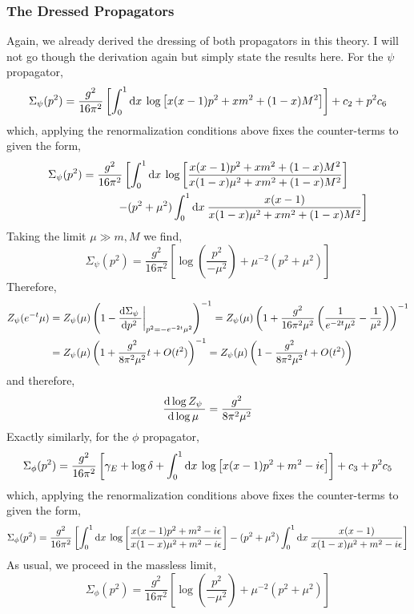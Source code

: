 \documentclass[12pt]{article}
\begin{document}
\subsubsection{The Dressed Propagators}

Again, we already derived the dressing of both propagators in this theory. I will not go though the derivation again but simply state the results here. 
For the $\psi$ propagator,
\[ \Sigma_\psi(p^2) = \frac{g^2}{16 \pi^2} \left[ \int_{0}^{1} \mathrm{d}x \: \log{\left[ x(x - 1) p^2 + x m^2 + (1 - x) M^2 \right]} \right] + c_2 + p^2 c_6 \]
which, applying the renormalization conditions above fixes the counter-terms to given the form,
\begin{align*}
\Sigma_\psi(p^2) & = \frac{g^2}{16 \pi^2} \left[ \int_{0}^{1} \mathrm{d}x \: \log{\left[ \frac{x(x - 1) p^2 + x m^2 + (1 - x) M^2}{x(1 - x)\mu^2 + x m^2 + (1 - x) M^2} \right]}  \right.
\\
& \left. \quad \quad \quad - (p^2 + \mu^2) \int_{0}^{1} \mathrm{d}x \: \frac{x(x - 1)}{x(1 - x)\mu^2 + x m^2 + (1 - x) M^2} \right]
\end{align*}
Taking the limit $\mu \gg m, M$ we find,
\[ \Sigma_\psi(p^2) = \frac{g^2}{16 \pi^2} \left[ \log{\left( \frac{p^2}{-\mu^2} \right)} + \mu^{-2} (p^2 + \mu^2) \right] \]
Therefore, 
\begin{align*}
Z_\psi(e^{-t} \mu) & = Z_{\psi}(\mu) \left(1 - \frac{\mathrm{d}\Sigma_\psi \:}{\mathrm{d}p^2 \:} \bigg|_{p^2 = - e^{-2t}\mu^2} \right)^{-1} = Z_\psi(\mu) \left( 1 + \frac{g^2}{16 \pi^2 \mu^2} \left( \frac{1}{e^{-2t} \mu^2} - \frac{1}{\mu^2} \right) \right)^{-1} 
\\
& = Z_\psi(\mu) \left( 1 + \frac{g^2}{8 \pi^2 \mu^2} t  + O(t^2) \right)^{-1} = Z_\psi(\mu) \left( 1 - \frac{g^2}{8 \pi^2 \mu^2} t  + O(t^2) \right)
\end{align*}
and therefore,
\[ \frac{\mathrm{d}\log{Z_{\psi}} \:}{\mathrm{d}\log{\mu} \:} = \frac{g^2}{8 \pi^2 \mu^2} \]
Exactly similarly, for the $\phi$ propagator, 
\[ \Sigma_\phi(p^2) = \frac{g^2}{16 \pi^2} \left[ \gamma_E + \log{\delta} + \int_{0}^{1} \mathrm{d}x \: \log{\left[ x(x-1)p^2 + m^2 - i \epsilon \right]} \right] + c_3 + p^2 c_5  \]
which, applying the renormalization conditions above fixes the counter-terms to given the form,
\[ \Sigma_\phi(p^2) = \frac{g^2}{16 \pi^2} \left[ \int_{0}^{1} \mathrm{d}x \: \log{\left[\frac{x(x-1)p^2 + m^2 - i \epsilon}{x(1-x)\mu^2 + m^2 - i \epsilon}\right]} - (p^2 + \mu^2) \int_{0}^{1} \mathrm{d}x \: \frac{x(x-1)}{x(1-x)\mu^2 + m^2 - i \epsilon} \right] \]
As usual, we proceed in the massless limit,
\[ \Sigma_\phi(p^2) = \frac{g^2}{16 \pi^2} \left[ \log{\left( \frac{p^2}{-\mu^2} \right)} + \mu^{-2} (p^2 + \mu^2) \right] \]
\end{document}
